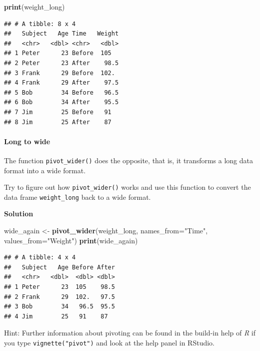 \documentclass[
]{scrartcl}
\makeatletter
\newenvironment{Shaded}{\begin{snugshade}}{\end{snugshade}}
\newcommand{\DataTypeTok}[1]{\textcolor[rgb]{0.13,0.29,0.53}{#1}}
\newcommand{\KeywordTok}[1]{\textcolor[rgb]{0.13,0.29,0.53}{\textbf{#1}}}
\newcommand{\NormalTok}[1]{#1}
\newcommand{\StringTok}[1]{\textcolor[rgb]{0.31,0.60,0.02}{#1}}
\newenvironment{kframe}{%
\medskip{}
\setlength{\fboxsep}{.8em}
 \def\at@end@of@kframe{}%
 \ifinner\ifhmode%
  \def\at@end@of@kframe{\end{minipage}}%
  \begin{minipage}{\columnwidth}%
 \fi\fi%
 \def\FrameCommand##1{\hskip\@totalleftmargin \hskip-\fboxsep
 \colorbox{shadecolor}{##1}\hskip-\fboxsep
     \hskip-\linewidth \hskip-\@totalleftmargin \hskip\columnwidth}%
 \MakeFramed {\advance\hsize-\width
   \@totalleftmargin\z@ \linewidth\hsize
   \@setminipage}}%
 {\par\unskip\endMakeFramed%
 \at@end@of@kframe}
\newenvironment{rmdblock}[1]
  {
  \begin{itemize}
  \renewcommand{\labelitemi}{
    \raisebox{-.7\height}[0pt][0pt]{
      {\setkeys{Gin}{width=3em,keepaspectratio}\texttt{[image: images/\#1]}}
    }
  }
  \setlength{\fboxsep}{1em}
  \begin{kframe}
  \item
  }
  {
  \end{kframe}
  \end{itemize}
  }
\newenvironment{myexercise}
    {\begin{rmdblock}{exercise_green}}
    {\end{rmdblock}}
\newenvironment{webexsolution}[1]
    {\par\tiny\textbf{#1}}
    {\par}
\newcommand{\webexhide}[1]{\begin{webexsolution}{#1}}
\newcommand{\webexunhide}{\end{webexsolution}}
\makeatother
\begin{document}
\begin{Shaded}
\begin{Highlighting}[]
\KeywordTok{print}\NormalTok{(weight\_long)}
\end{Highlighting}
\end{Shaded}

\begin{verbatim}
## # A tibble: 8 x 4
##   Subject   Age Time   Weight
##   <chr>   <dbl> <chr>   <dbl>
## 1 Peter      23 Before  105  
## 2 Peter      23 After    98.5
## 3 Frank      29 Before  102. 
## 4 Frank      29 After    97.5
## 5 Bob        34 Before   96.5
## 6 Bob        34 After    95.5
## 7 Jim        25 Before   91  
## 8 Jim        25 After    87
\end{verbatim}

\hypertarget{long-to-wide}{%
\paragraph*{Long to wide}\label{long-to-wide}}

The function \texttt{pivot\_wider()} does the opposite, that is, it transforms a long data format into a wide format.

\begin{myexercise}
Try to figure out how \texttt{pivot\_wider()} works and use this
function to convert the data frame \texttt{weight\_long} back to a wide
format.
\end{myexercise}
\webexhide{Solution}

\begin{Shaded}
\begin{Highlighting}[]
\NormalTok{wide\_again \textless{}{-}}\StringTok{ }\KeywordTok{pivot\_wider}\NormalTok{(weight\_long, }\DataTypeTok{names\_from=}\StringTok{"Time"}\NormalTok{, }\DataTypeTok{values\_from=}\StringTok{"Weight"}\NormalTok{)}
\KeywordTok{print}\NormalTok{(wide\_again)}
\end{Highlighting}
\end{Shaded}

\begin{verbatim}
## # A tibble: 4 x 4
##   Subject   Age Before After
##   <chr>   <dbl>  <dbl> <dbl>
## 1 Peter      23  105    98.5
## 2 Frank      29  102.   97.5
## 3 Bob        34   96.5  95.5
## 4 Jim        25   91    87
\end{verbatim}

\webexunhide

Hint: Further information about pivoting can be found in the build-in help of \emph{R} if you type \texttt{vignette("pivot")} and look at the help panel in RStudio.
\end{document}
